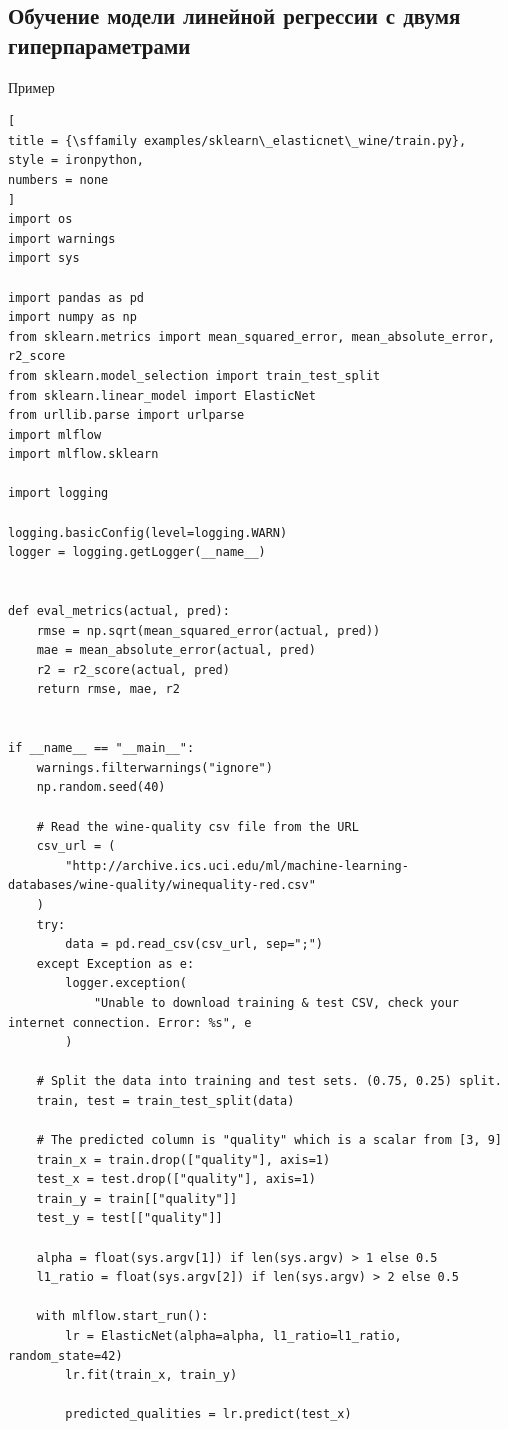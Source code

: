 \documentclass[%
	11pt,
	a4paper,
	utf8,
		]{article}
\begin{document}
\subsection{Обучение модели линейной регрессии с двумя гиперпараметрами}

Пример
\begin{lstlisting}[
title = {\sffamily examples/sklearn\_elasticnet\_wine/train.py},
style = ironpython,
numbers = none	
]
import os
import warnings
import sys

import pandas as pd
import numpy as np
from sklearn.metrics import mean_squared_error, mean_absolute_error, r2_score
from sklearn.model_selection import train_test_split
from sklearn.linear_model import ElasticNet
from urllib.parse import urlparse
import mlflow
import mlflow.sklearn

import logging

logging.basicConfig(level=logging.WARN)
logger = logging.getLogger(__name__)


def eval_metrics(actual, pred):
    rmse = np.sqrt(mean_squared_error(actual, pred))
    mae = mean_absolute_error(actual, pred)
    r2 = r2_score(actual, pred)
    return rmse, mae, r2


if __name__ == "__main__":
    warnings.filterwarnings("ignore")
    np.random.seed(40)

    # Read the wine-quality csv file from the URL
    csv_url = (
        "http://archive.ics.uci.edu/ml/machine-learning-databases/wine-quality/winequality-red.csv"
    )
    try:
        data = pd.read_csv(csv_url, sep=";")
    except Exception as e:
        logger.exception(
            "Unable to download training & test CSV, check your internet connection. Error: %s", e
        )

    # Split the data into training and test sets. (0.75, 0.25) split.
    train, test = train_test_split(data)

    # The predicted column is "quality" which is a scalar from [3, 9]
    train_x = train.drop(["quality"], axis=1)
    test_x = test.drop(["quality"], axis=1)
    train_y = train[["quality"]]
    test_y = test[["quality"]]

    alpha = float(sys.argv[1]) if len(sys.argv) > 1 else 0.5
    l1_ratio = float(sys.argv[2]) if len(sys.argv) > 2 else 0.5

    with mlflow.start_run():
        lr = ElasticNet(alpha=alpha, l1_ratio=l1_ratio, random_state=42)
        lr.fit(train_x, train_y)

        predicted_qualities = lr.predict(test_x)


\end{lstlisting}
\end{document}
